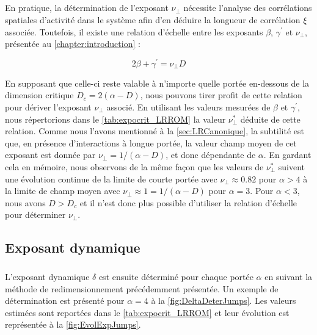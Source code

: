 \subparagraph{}En pratique, la détermination de l'exposant $\nu_\perp$ nécessite l'analyse des corrélations spatiales d'activité dans le système afin d'en déduire la longueur de corrélation $\xi$ associée. Toutefois, il existe une relation d'échelle entre les exposants $\beta$, $\gamma^\prime$ et $\nu_\perp$, présentée au \autoref{chapter:introduction} :

\begin{equation}
	2\beta + \gamma^\prime = \nu_\perp D
	\label{eq:HyperScaling}
\end{equation}

\noindent En supposant que celle-ci reste valable à n'importe quelle portée en-dessous de la dimension critique $D_c = 2(\alpha-D)$, nous pouvons tirer profit de cette relation pour dériver l'exposant $\nu_\perp$ associé. En utilisant les valeurs mesurées de $\beta$ et $\gamma^\prime$, nous répertorions dans le \autoref{tab:expocrit_LRROM} la valeur $\nu_\perp^*$ déduite de cette relation. Comme nous l'avons mentionné à la \autoref{sec:LRCanonique}, la subtilité est que, en présence d'interactions à longue portée, la valeur champ moyen de cet exposant est donnée par $\nu_\perp = 1/(\alpha-D)$, et donc dépendante de $\alpha$. En gardant cela en mémoire, nous observons de la même façon que les valeurs de $\nu_\perp^*$ suivent une évolution continue de la limite de courte portée avec $\nu_\perp \approx 0.82$ pour $\alpha>4$ à la limite de champ moyen avec $\nu_\perp\approx 1 = 1/(\alpha-D)$ pour $\alpha=3$. Pour $\alpha < 3$, nous avons $D>D_c$ et il n'est donc plus possible d'utiliser la relation d'échelle pour déterminer $\nu_\perp$. 


\subsection{Exposant dynamique}

\label{sec:expdynjump}

\subparagraph{}L'exposant dynamique $\delta$ est ensuite déterminé pour chaque portée $\alpha$ en suivant la méthode de redimensionnement précédemment présentée. Un exemple de détermination est présenté pour $\alpha = 4$ à la \autoref{fig:DeltaDeterJumps}. Les valeurs estimées sont reportées dans le \autoref{tab:expocrit_LRROM} et leur évolution est représentée à la \autoref{fig:EvolExpJumps}.

